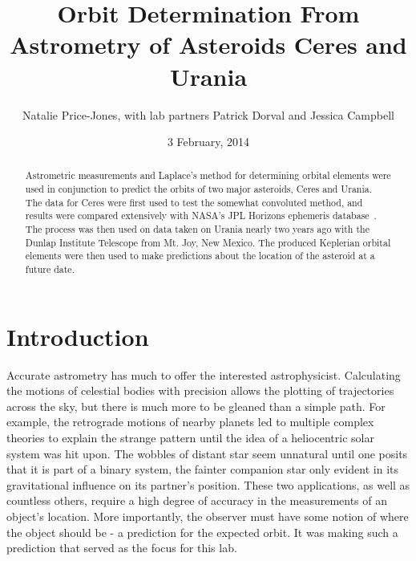 \documentclass[a4paper,12pt]{article}
\begin{document}
\onehalfspacing
\title{Orbit Determination From Astrometry of Asteroids Ceres and Urania}
\author{Natalie Price-Jones, with lab partners Patrick Dorval and Jessica Campbell}
\date{3 February, 2014}
\maketitle


\begin{abstract}
\label{abstract}

Astrometric measurements and Laplace's method for determining orbital elements were used in conjunction to predict the orbits of two major asteroids, Ceres and Urania. The data for Ceres were first used to test the somewhat convoluted method, and results were compared extensively with NASA's JPL Horizons ephemeris database~\citep{urania}. The process was then used on data taken on Urania nearly two years ago with the Dunlap Institute Telescope from Mt. Joy, New Mexico. The produced Keplerian orbital elements were then used to make predictions about the location of the asteroid at a future date.

\end{abstract}


\section{Introduction}
\label{sec:intro}

Accurate astrometry has much to offer the interested astrophysicist. Calculating the motions of celestial bodies with precision allows the plotting of trajectories across the sky, but there is much more to be gleaned than a simple path. For example, the retrograde motions of nearby planets led to multiple complex theories to explain the strange pattern until the idea of a heliocentric solar system was hit upon. The wobbles of distant star seem unnatural until one posits that it is part of a binary system, the fainter companion star only evident in its gravitational influence on its partner's position. These two applications, as well as countless others, require a high degree of accuracy in the measurements of an object's location. More importantly, the observer must have some notion of where the object should be - a prediction for the expected orbit. It was making such a prediction that served as the focus for this lab. 
\end{document}
